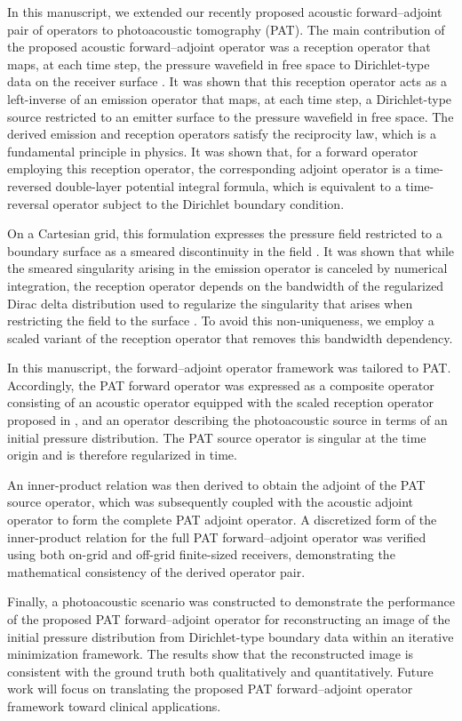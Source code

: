 \documentclass[11pt,reqno]{amsart}
\theoremstyle{remark}
\begin{document}
In this manuscript, we extended our recently proposed acoustic forward--adjoint pair of operators \cite{Javaherian2022} to photoacoustic tomography (PAT). The main contribution of the proposed acoustic forward--adjoint operator was a reception operator that maps, at each time step, the pressure wavefield in free space to Dirichlet-type data on the receiver surface \cite{Javaherian2022}. It was shown that this reception operator acts as a left-inverse of an emission operator that maps, at each time step, a Dirichlet-type source restricted to an emitter surface to the pressure wavefield in free space. The derived emission and reception operators satisfy the reciprocity law, which is a fundamental principle in physics. It was shown that, for a forward operator employing this reception operator, the corresponding adjoint operator is a time-reversed double-layer potential integral formula, which is equivalent to a time-reversal operator subject to the Dirichlet boundary condition.


On a Cartesian grid, this formulation expresses the pressure field restricted to a boundary surface as a smeared discontinuity in the field \cite{Javaherian2022}. It was shown that while the smeared singularity arising in the emission operator is canceled by numerical integration, the reception operator depends on the bandwidth of the regularized Dirac delta distribution used to regularize the singularity that arises when restricting the field to the surface \cite{Javaherian2022}. To avoid this non-uniqueness, we employ a scaled variant of the reception operator that removes this bandwidth dependency.

In this manuscript, the forward--adjoint operator framework was tailored to PAT. Accordingly, the PAT forward operator was expressed as a composite operator consisting of an acoustic operator equipped with the scaled reception operator proposed in \cite{Javaherian2022}, and an operator describing the photoacoustic source in terms of an initial pressure distribution. The PAT source operator is singular at the time origin and is therefore regularized in time.

An inner-product relation was then derived to obtain the adjoint of the PAT source operator, which was subsequently coupled with the acoustic adjoint operator to form the complete PAT adjoint operator. A discretized form of the inner-product relation for the full PAT forward--adjoint operator was verified using both on-grid and off-grid finite-sized receivers, demonstrating the mathematical consistency of the derived operator pair.

Finally, a photoacoustic scenario was constructed to demonstrate the performance of the proposed PAT forward--adjoint operator for reconstructing an image of the initial pressure distribution from Dirichlet-type boundary data within an iterative minimization framework. The results show that the reconstructed image is consistent with the ground truth both qualitatively and quantitatively. Future work will focus on translating the proposed PAT forward--adjoint operator framework toward clinical applications. 




\end{document}
